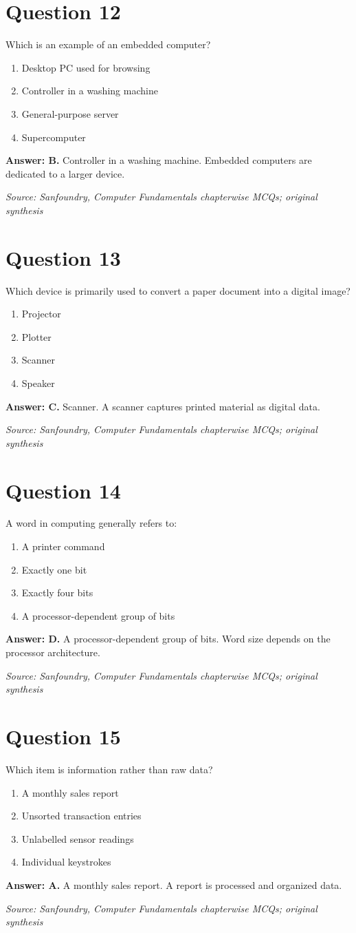\documentclass[11pt,a4paper]{book}
\newcommand{\source}[1]{\par\smallskip\textit{Source: #1}}
\newcommand{\answer}[2]{\par\textbf{Answer: #1.} #2}
\begin{document}
\section*{Question 12}
Which is an example of an embedded computer?
\begin{enumerate}[label=\Alph*.]
\item Desktop PC used for browsing
\item Controller in a washing machine
\item General-purpose server
\item Supercomputer
\end{enumerate}
\answer{B}{Controller in a washing machine. Embedded computers are dedicated to a larger device.}
\source{Sanfoundry, Computer Fundamentals chapterwise MCQs; original synthesis}
\section*{Question 13}
Which device is primarily used to convert a paper document into a digital image?
\begin{enumerate}[label=\Alph*.]
\item Projector
\item Plotter
\item Scanner
\item Speaker
\end{enumerate}
\answer{C}{Scanner. A scanner captures printed material as digital data.}
\source{Sanfoundry, Computer Fundamentals chapterwise MCQs; original synthesis}
\section*{Question 14}
A word in computing generally refers to:
\begin{enumerate}[label=\Alph*.]
\item A printer command
\item Exactly one bit
\item Exactly four bits
\item A processor-dependent group of bits
\end{enumerate}
\answer{D}{A processor-dependent group of bits. Word size depends on the processor architecture.}
\source{Sanfoundry, Computer Fundamentals chapterwise MCQs; original synthesis}
\section*{Question 15}
Which item is information rather than raw data?
\begin{enumerate}[label=\Alph*.]
\item A monthly sales report
\item Unsorted transaction entries
\item Unlabelled sensor readings
\item Individual keystrokes
\end{enumerate}
\answer{A}{A monthly sales report. A report is processed and organized data.}
\source{Sanfoundry, Computer Fundamentals chapterwise MCQs; original synthesis}
\end{document}
